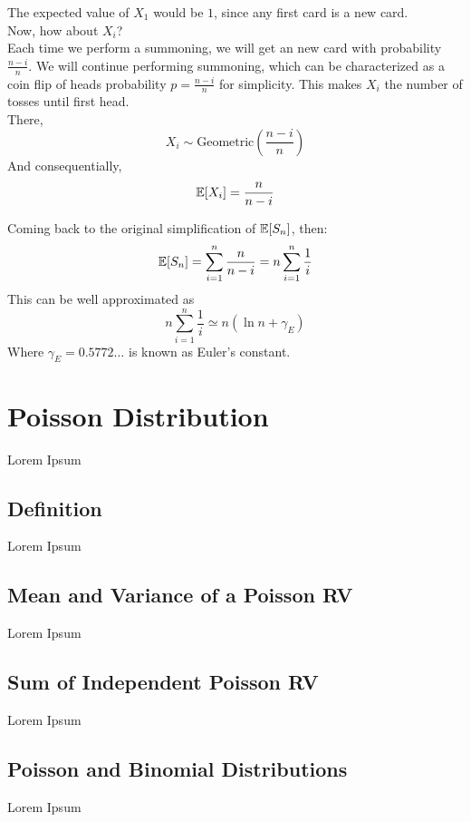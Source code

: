 The expected value of $X_1$ would be $1$, since any first card is a new card. \\
Now, how about $X_i$? \\
Each time we perform a summoning, we will get an new card with probability $\frac{n - i}{n}$. We will continue performing summoning, which can be characterized as a coin flip of heads probability $p = \frac{n - i}{n}$ for simplicity. This makes $X_i$ the number of tosses until first head. \\
There, 
\[X_i \sim \text{Geometric}(\frac{n - i}{n})\]
And consequentially,
\[\mathbb{E}[X_i] = \frac{n}{n - i}\]

Coming back to the original simplification of $\mathbb{E}[S_n]$, then:
\[
    \mathbb{E}[S_n] = \sum_{i = 1}^n \frac{n}{n - i} = n\sum_{i = 1}^n \frac{1}{i}
\]
This can be well approximated as
\[
    n\sum_{i = 1}^n \frac{1}{i} \simeq n(\ln{n} + \gamma_E)
\]
Where $\gamma_E=0.5772\dots$ is known as Euler's constant.

\section{Poisson Distribution}
Lorem Ipsum

\subsection{Definition}
Lorem Ipsum

\subsection{Mean and Variance of a Poisson RV}
Lorem Ipsum

\subsection{Sum of Independent Poisson RV}
Lorem Ipsum

\subsection{Poisson and Binomial Distributions}
Lorem Ipsum
